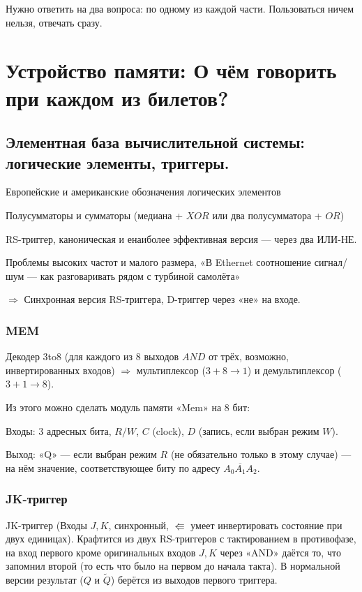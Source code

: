 \documentclass[12pt, a4paper]{article}
\begin{document}
Нужно ответить на два вопроса: по одному из каждой части. Пользоваться ничем нельзя, отвечать сразу.


\section{Устройство памяти: О чём говорить при каждом из билетов?}


\subsection{Элементная база вычислительной системы: логические элементы, триггеры.}

Европейские и американские обозначения логических элементов

Полусумматоры и сумматоры (медиана + $XOR$ или два полусумматора + $OR$)

RS-триггер, каноническая и енаиболее эффективная версия — через два ИЛИ-НЕ.

Проблемы высоких частот и малого размера, «В Ethernet соотношение сигнал/шум — как разговаривать рядом с турбиной самолёта»

$\Longrightarrow$ Синхронная версия RS-триггера, D-триггер через «не» на входе.



\subsubsection{MEM}

Декодер 3to8 (для каждого из 8 выходов $AND$ от трёх, возможно, инвертированных входов) 
$\Longrightarrow$ мультиплексор ($3 + 8 → 1$) и демультиплексор ($3 + 1 → 8$).

Из этого можно сделать модуль памяти «Mem» на 8 бит: 

Входы: 3 адресных бита, $R/W$, $C$ (clock), $D$ (запись, если выбран режим $W$).

Выход: «Q» — если выбран режим $R$ (не обязательно только в этому случае)
— на нём значение, соответствующее биту по адресу $\overline{A_0 \! A_1 \! A_2}$.


\subsubsection{JK-триггер}

JK-триггер (Входы $J, K$, синхронный, $\Lleftarrow$ умеет инвертировать состояние при двух единицах). 
Крафтится из двух RS-триггеров с тактированием в противофазе, 
на вход первого кроме оригинальных входов $J, K$ через «AND» даётся то, 
что запомнил второй (то есть что было на первом до начала такта).
В нормальной версии результат ($Q$ и $\tilde Q$) берётся из выходов первого триггера.
\end{document}
